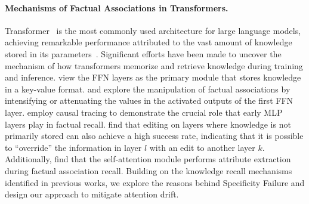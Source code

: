 \paragraph{Mechanisms of Factual Associations in Transformers.} Transformer~\citep{vaswani2017attention} is the most commonly used architecture for large language models, achieving remarkable performance attributed to the vast amount of knowledge stored in its parameters~\citep{petroni2019language,roberts2020much,cao2023retentive}. 
Significant efforts have been made to uncover the mechanism of how transformers memorize and retrieve knowledge during training and inference.
\citet{geva2021transformer} view the FFN layers as the primary module that stores knowledge in a key-value format. 
\citet{dai2021knowledge} and \citet{geva2022transformer} explore the manipulation of factual associations by intensifying or attenuating the values in the activated outputs of the first FFN layer.
\citet{rome} employ causal tracing to demonstrate the crucial role that early MLP layers play in factual recall.
\citet{localize_inform_edit} find that editing on layers where knowledge is not primarily stored can also achieve a high success rate, indicating that it is possible to “override” the information in layer $l$ with an edit to another layer $k$.
Additionally, \citet{hao2021self} find that the self-attention module performs attribute extraction during factual association recall. 
Building on the knowledge recall mechanisms identified in previous works, we explore the reasons behind Specificity Failure and design our approach to mitigate attention drift.



